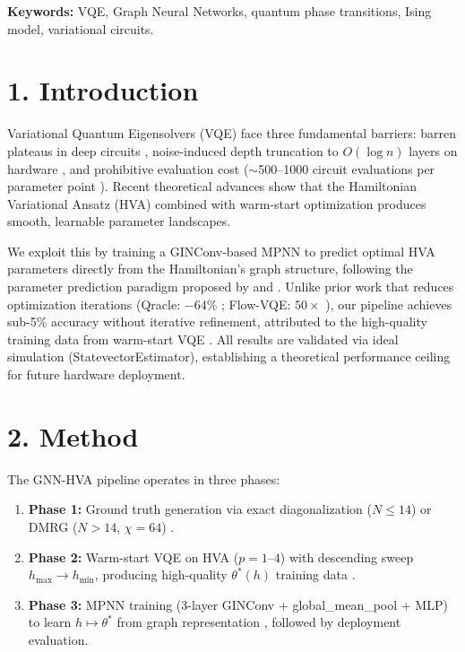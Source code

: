 \documentclass[11pt,a4paper,spanish]{book}
\begin{document}
\vspace{0.3cm}
\noindent\textbf{Keywords:} VQE, Graph Neural Networks, quantum phase transitions, Ising model, variational circuits.

\section*{1. Introduction}

Variational Quantum Eigensolvers (VQE) face three fundamental barriers: barren plateaus in deep circuits \citep{mcclean2018}, noise-induced depth truncation to $O(\log n)$ layers on hardware \citep{mele2026}, and prohibitive evaluation cost ($\sim$500--1000 circuit evaluations per parameter point \citep{tilly2022}). Recent theoretical advances show that the Hamiltonian Variational Ansatz (HVA) \citep{wiersema2020} combined with warm-start optimization \citep{puig2025} produces smooth, learnable parameter landscapes.

We exploit this by training a GINConv-based MPNN \citep{xu2019} to predict optimal HVA parameters directly from the Hamiltonian's graph structure, following the parameter prediction paradigm proposed by \citet{miao2024} and \citet{zhang2025}. Unlike prior work that reduces optimization iterations (Qracle: $-$64\% \citep{zhang2025}; Flow-VQE: $50\times$ \citep{zou2026}), our pipeline achieves sub-5\% accuracy without iterative refinement, attributed to the high-quality training data from warm-start VQE \citep{puig2025, schiffer2026}. All results are validated via ideal simulation (StatevectorEstimator), establishing a theoretical performance ceiling for future hardware deployment.

\section*{2. Method}

The GNN-HVA pipeline operates in three phases:
\begin{enumerate}
    \item \textbf{Phase 1:} Ground truth generation via exact diagonalization ($N \leq 14$) or DMRG ($N > 14$, $\chi = 64$) \citep{hauschild2018}.
    \item \textbf{Phase 2:} Warm-start VQE on HVA ($p = 1$--$4$) with descending sweep $h_{\max} \to h_{\min}$, producing high-quality $\theta^*(h)$ training data \citep{puig2025}.
    \item \textbf{Phase 3:} MPNN training (3-layer GINConv + global\_mean\_pool + MLP) to learn $h \mapsto \theta^*$ from graph representation \citep{fey2019}, followed by deployment evaluation.
\end{enumerate}
\end{document}
